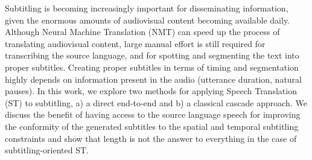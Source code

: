 Subtitling is becoming increasingly important for disseminating information, given the enormous amounts of audiovisual content becoming available daily. Although Neural Machine Translation (NMT) can speed up the process of translating audiovisual content, large manual effort is still required for transcribing the source language, and for spotting and segmenting the text into proper subtitles. Creating proper subtitles in terms of timing and segmentation highly depends on information present in the audio (utterance duration, natural pauses). In this work, we explore two methods for applying Speech Translation (ST) to subtitling, a) a direct end-to-end and b) a classical cascade approach. We discuss the benefit of having access to the source language speech for improving the conformity of the generated subtitles to the spatial and temporal subtitling constraints and show that length is not the answer to everything in the case of subtitling-oriented ST.

